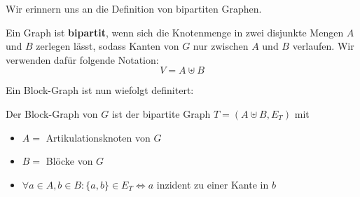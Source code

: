 \documentclass[a4paper]{report}
\begin{document}
Wir erinnern uns an die Definition von bipartiten Graphen.

\begin{definition}
    Ein Graph ist \textbf{bipartit}, wenn sich die Knotenmenge in zwei disjunkte Mengen
    $A$ und $B$ zerlegen lässt, sodass Kanten von $G$ nur zwischen $A$ und $B$ verlaufen.
    Wir verwenden dafür folgende Notation:
    $$V = A \uplus B$$
\end{definition}
\bigskip

Ein Block-Graph ist nun wiefolgt definitert:

\begin{definition}
    Der Block-Graph von $G$ ist der bipartite Graph $T = (A \uplus B, E_T )$ mit
    \begin{itemize}
        \item $A =$ {Artikulationsknoten von $G$}
        \item $B =$ {Blöcke von $G$}
        \item $\forall a \in A , b \in B: \{a,b\} \in E_T \Leftrightarrow a$ inzident zu einer Kante in $b$
    \end{itemize}
\end{definition}
\bigskip
\end{document}

